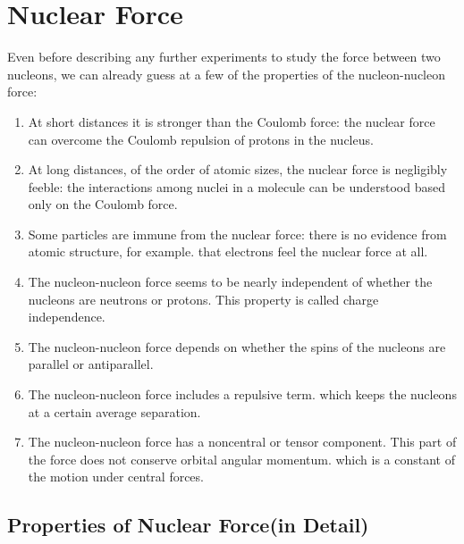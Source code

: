 \chapter{Nuclear Force}
Even before describing any further experiments to study the force between two nucleons, we can already guess at a few of the properties of the nucleon-nucleon force:\\
\begin{enumerate}
	\item At short distances it is stronger than the Coulomb force: the nuclear force can overcome the Coulomb repulsion of protons in the nucleus.
	\item At long distances, of the order of atomic sizes, the nuclear force is negligibly feeble: the interactions among nuclei in a molecule can be understood based only on the Coulomb force.
	\item Some particles are immune from the nuclear force: there is no evidence from atomic structure, for example. that electrons feel the nuclear force at all.
	\item The nucleon-nucleon force seems to be nearly independent of whether the nucleons are neutrons or protons. This property is called charge independence.
	\item The nucleon-nucleon force depends on whether the spins of the nucleons are parallel or antiparallel.
	\item The nucleon-nucleon force includes a repulsive term. which keeps the nucleons at a certain average separation.
	\item The nucleon-nucleon force has a noncentral or tensor component. This part of the force does not conserve orbital angular momentum. which is a constant of the motion under central forces.
\end{enumerate}
\section{Properties of Nuclear Force(in Detail)}
